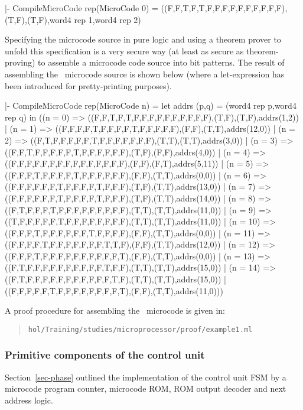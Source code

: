 \begintt
|- CompileMicroCode rep(MicroCode 0) =
   ((F,F,T,F,T,F,F,F,F,F,F,F,F,F,F),(T,F),(T,F),word4 rep 1,word4 rep 2)
\endtt

Specifying the microcode source in pure logic and using
a theorem prover to unfold this specification is
a very secure way (at least as secure as theorem-proving)
to assemble a microcode code source into bit patterns.
The result of assembling the \Tamarack\ microcode source
is shown below (where a let-expression has been introduced
for pretty-printing purposes).

\begintt
|- CompileMicroCode rep(MicroCode n) =
   let addrs (p,q) = (word4 rep p,word4 rep q) in
   ((n = 0) => ((F,F,T,F,T,F,F,F,F,F,F,F,F,F,F),(T,F),(T,F),addrs(1,2)) |
    (n = 1) => ((F,F,F,F,T,F,F,F,F,T,F,F,F,F,F),(F,F),(T,T),addrs(12,0)) |
    (n = 2) => ((F,T,F,F,F,F,F,T,F,F,F,F,F,F,F),(T,T),(T,T),addrs(3,0)) |
    (n = 3) => ((F,F,T,F,F,F,F,F,T,F,F,F,F,F,F),(T,F),(F,F),addrs(4,0)) |
    (n = 4) => ((F,F,F,F,F,F,F,F,F,F,F,F,F,F,F),(F,F),(F,T),addrs(5,11)) |
    (n = 5) => ((F,F,F,T,F,F,F,F,T,F,F,F,F,F,F),(F,F),(T,T),addrs(0,0)) |
    (n = 6) => ((F,F,F,F,F,F,T,F,F,F,F,T,F,F,F),(T,F),(T,T),addrs(13,0)) |
    (n = 7) => ((F,F,F,F,F,F,T,F,F,F,F,T,F,F,F),(T,F),(T,T),addrs(14,0)) |
    (n = 8) => ((F,T,F,F,F,T,F,F,F,F,F,F,F,F,F),(T,T),(T,T),addrs(11,0)) |
    (n = 9) => ((T,F,F,F,F,F,T,F,F,F,F,F,F,F,F),(T,T),(T,T),addrs(11,0)) |
    (n = 10) => ((F,F,F,T,F,F,F,F,F,F,T,F,F,F,F),(F,F),(T,T),addrs(0,0)) |
    (n = 11) => ((F,F,F,F,T,F,F,F,F,F,F,F,T,T,F),(F,F),(T,T),addrs(12,0)) |
    (n = 12) => ((F,F,F,T,F,F,F,F,F,F,F,F,F,F,T),(F,F),(T,T),addrs(0,0)) |
    (n = 13) => ((F,T,F,F,F,F,F,F,F,F,F,F,T,F,F),(T,T),(T,T),addrs(15,0)) |
    (n = 14) => ((F,T,F,F,F,F,F,F,F,F,F,F,F,T,F),(T,T),(T,T),addrs(15,0)) |
                ((F,F,F,F,F,T,F,F,F,F,F,F,F,F,T),(F,F),(T,T),addrs(11,0)))
\endtt

A proof procedure for assembling the \Tamarack\ microcode is given in:

\begin{quote}
\verb"hol/Training/studies/microprocessor/proof/example1.ml"
\end{quote}

\subsubsection{Primitive components of the control unit}

Section~\ref{sec-phase} outlined the implementation of the
control unit FSM by a microcode program
counter, microcode ROM,
ROM output decoder and next address logic.

